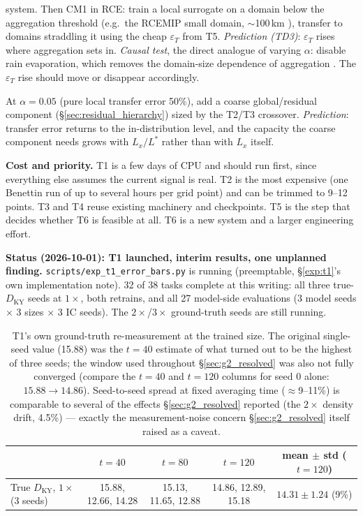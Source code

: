 \documentclass[11pt]{article}
\begin{document}
\begin{description}[style=nextline,leftmargin=1.2em]
  system. Then CM1 \cite{bryanfritsch2002} in RCE: train a local surrogate
  on a domain below the aggregation threshold (e.g.\ the RCEMIP small
  domain, $\sim$100\,km \cite{wing2020rcemip}), transfer to domains
  straddling it using the cheap $\varepsilon_T$ from T5. \emph{Prediction
  (TD3)}: $\varepsilon_T$ rises where aggregation sets in. \emph{Causal
  test}, the direct analogue of varying $\alpha$: disable rain
  evaporation, which removes the domain-size dependence of aggregation
  \cite{jeevanjeeromps2013}. The $\varepsilon_T$ rise should move or
  disappear accordingly.
\item[T7 --- Use the diagnostic to design the hybrid.] \label{exp:t7}
  At $\alpha=0.05$ (pure local transfer error 50\%), add a coarse
  global/residual component (\S\ref{sec:residual_hierarchy}) sized by the
  T2/T3 crossover. \emph{Prediction}: transfer error returns to the
  in-distribution level, and the capacity the coarse component needs
  grows with $L_x/L^*$ rather than with $L_x$ itself.
\end{description}

\textbf{Cost and priority.} T1 is a few days of CPU and should run
first, since everything else assumes the current signal is real. T2 is
the most expensive (one Benettin run of up to several hours per grid
point) and can be trimmed to 9--12 points. T3 and T4 reuse existing
machinery and checkpoints. T5 is the step that decides whether T6 is
feasible at all. T6 is a new system and a larger engineering effort.

\textbf{Status (2026-10-01): T1 launched, interim results, one unplanned
finding.} \texttt{scripts/exp\_t1\_error\_bars.py} is running (preemptable,
\S\ref{exp:t1}'s own implementation note). 32 of 38 tasks complete at this
writing: all three true-$D_{\mathrm{KY}}$ seeds at $1\times$, both
retrains, and all 27 model-side evaluations (3 model seeds $\times$ 3
sizes $\times$ 3 IC seeds). The $2\times$/$3\times$ ground-truth seeds are
still running.

\begin{table}[h]
\centering
\begin{tabular}{lcccc}
\toprule
 & $t=40$ & $t=80$ & $t=120$ & mean $\pm$ std ($t{=}120$) \\
\midrule
True $D_{\mathrm{KY}}$, $1\times$ (3 seeds) & 15.88, 12.66, 14.28 &
  15.13, 11.65, 12.88 & 14.86, 12.89, 15.18 & $14.31\pm1.24$ (9\%) \\
\bottomrule
\end{tabular}
\caption{T1's own ground-truth re-measurement at the trained size. The
original single-seed value (15.88) was the $t{=}40$ estimate of what
turned out to be the highest of three seeds; the window used throughout
\S\ref{sec:g2_resolved} was also not fully converged (compare the
$t{=}40$ and $t{=}120$ columns for seed 0 alone: $15.88\to14.86$).
Seed-to-seed spread at fixed averaging time ($\approx$9--11\%) is
comparable to several of the effects \S\ref{sec:g2_resolved} reported
(the $2\times$ density drift, 4.5\%) --- exactly the measurement-noise
concern \S\ref{sec:g2_resolved} itself raised as a caveat.}
\label{tab:t1_truth_1x}
\end{table}
\end{document}
